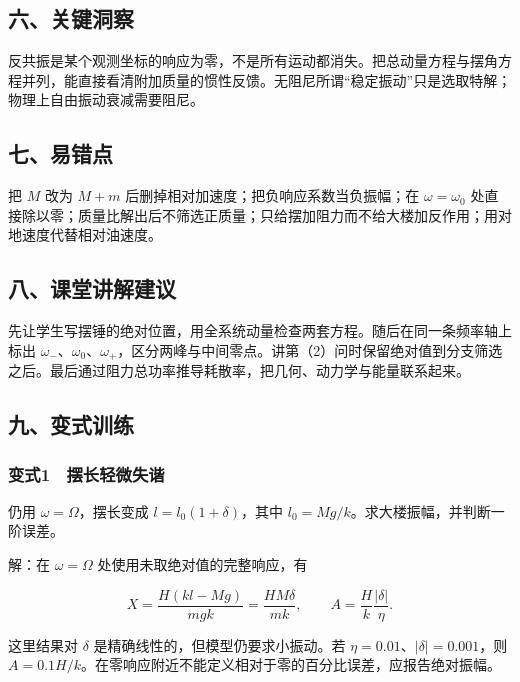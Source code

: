 \documentclass[12pt,a4paper,fontset=fandol]{ctexart}
\begin{document}
\subsection{六、关键洞察}\label{ux516dux5173ux952eux6d1eux5bdf}

反共振是某个观测坐标的响应为零，不是所有运动都消失。把总动量方程与摆角方程并列，能直接看清附加质量的惯性反馈。无阻尼所谓``稳定振动''只是选取特解；物理上自由振动衰减需要阻尼。

\subsection{七、易错点}\label{ux4e03ux6613ux9519ux70b9}

把 \(M\) 改为 \(M+m\) 后删掉相对加速度；把负响应系数当负振幅；在
\(\omega=\omega_0\)
处直接除以零；质量比解出后不筛选正质量；只给摆加阻力而不给大楼加反作用；用对地速度代替相对油速度。

\subsection{八、课堂讲解建议}\label{ux516bux8bfeux5802ux8bb2ux89e3ux5efaux8bae}

先让学生写摆锤的绝对位置，用全系统动量检查两套方程。随后在同一条频率轴上标出
\(\omega_-\)、\(\omega_0\)、\(\omega_+\)，区分两峰与中间零点。讲第（2）问时保留绝对值到分支筛选之后。最后通过阻力总功率推导耗散率，把几何、动力学与能量联系起来。

\subsection{九、变式训练}\label{ux4e5dux53d8ux5f0fux8badux7ec3}

\subsubsection{变式1　摆长轻微失谐}\label{ux53d8ux5f0f1-ux6446ux957fux8f7bux5faeux5931ux8c10}

仍用 \(\omega=\Omega\)，摆长变成 \(l=l_0(1+\delta)\)，其中
\(l_0=Mg/k\)。求大楼振幅，并判断一阶误差。

解：在 \(\omega=\Omega\) 处使用未取绝对值的完整响应，有

\[X=\frac{H(kl-Mg)}{mgk}
=\frac{HM\delta}{mk},\qquad
A=\frac Hk\frac{|\delta|}{\eta}.\]

这里结果对 \(\delta\) 是精确线性的，但模型仍要求小振动。若
\(\eta=0.01\)、\(|\delta|=0.001\)，则
\(A=0.1H/k\)。在零响应附近不能定义相对于零的百分比误差，应报告绝对振幅。
\end{document}

